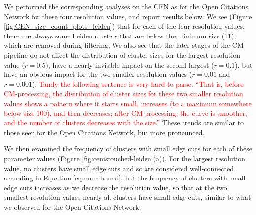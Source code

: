 \documentclass[11pt]{article}   	%
\begin{document}
We performed the corresponding analyses on the CEN as for the Open Citations Network for these four resolution values, and report results below.
We see (Figure \ref{fig:CEN_size_count_plots_leiden}) that  for each of the four resolution values, there are always some Leiden clusters  that are below
the minimum size (11), which are removed during filtering. We also see that  the later stages of the CM pipeline do not affect the distribution of cluster sizes for the
largest resolution value ($r=0.5$), have a nearly invisible impact on the second largest ($r=0.1$), but have an obvious impact for the two smaller resolution values
($r=0.01$ and $r=0.001$). \textcolor{red}{Tandy the following sentence is very hard to parse. ``That is, before CM-processing, the distribution of cluster sizes for these two smaller resolution values shows a pattern where it starts small, increases (to a maximum somewhere below size $100$), and then decreases; after CM-processing, the curve is smoother, and the number of clusters  decreases with the size.''}
These trends are similar to those seen for the Open Citations Network, but more pronounced.

We then examined the frequency of   clusters with small edge cuts for each of these parameter values (Figure \ref{fig:cenistouched-leiden}(a)).
For the largest resolution value, no clusters have small edge cuts and so are considered  well-connected according to Equation \ref{eqn:our-bound}, but the frequency of clusters with small edge cuts increases as we decrease the resolution value, so that at the two smallest resolution values nearly all clusters have small edge cuts, similar to what we observed for the Open Citations Network.
\end{document}
